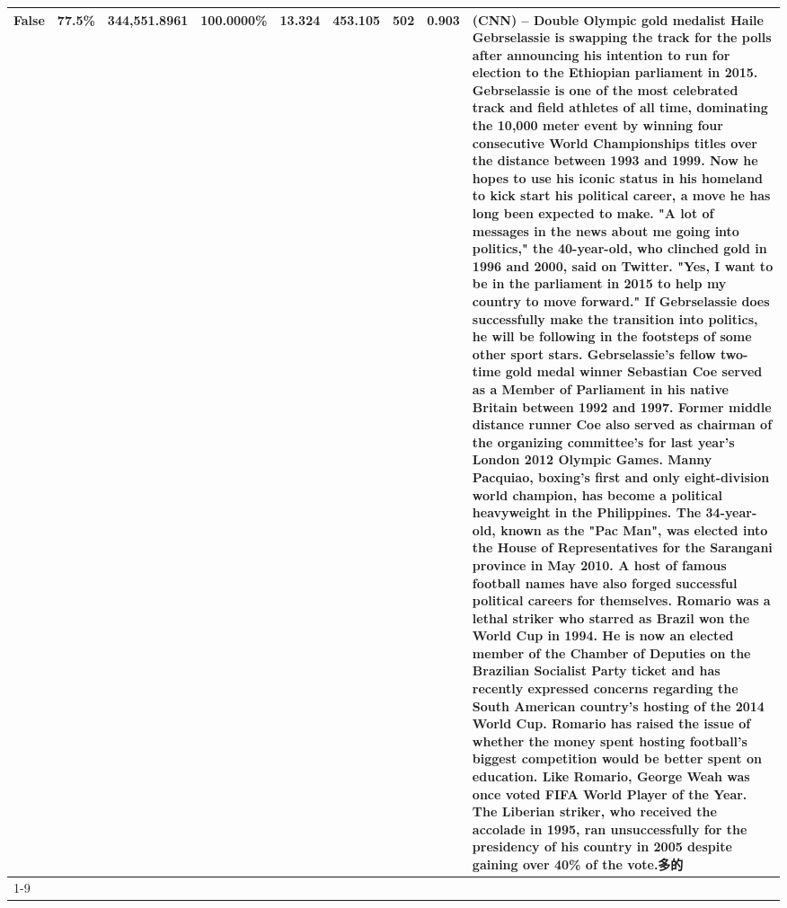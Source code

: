 \begin{table}[H]
{\begin{tabular}{lllrlllll}
False & 77.5\% & 344,551.8961 & \bfseries \color{red} 100.0000\% & 13.324 & 453.105 & 502 & 0.903 & (CNN) -- Double Olympic gold medalist Haile Gebrselassie is swapping the track for the polls after announcing his intention to run for election to the Ethiopian parliament in 2015. Gebrselassie is one of the most celebrated track and field athletes of all time, dominating the 10,000 meter event by winning four consecutive World Championships titles over the distance between 1993 and 1999. Now he hopes to use his iconic status in his homeland to kick start his political career, a move he has long been expected to make. "A lot of messages in the news about me going into politics," the 40-year-old, who clinched gold in 1996 and 2000, said on Twitter. "Yes, I want to be in the parliament in 2015 to help my country to move forward." If Gebrselassie does successfully make the transition into politics, he will be following in the footsteps of some other sport stars. Gebrselassie's fellow two-time gold medal winner Sebastian Coe served as a Member of Parliament in his native Britain between 1992 and 1997. Former middle distance runner Coe also served as chairman of the organizing committee's for last year's London 2012 Olympic Games. Manny Pacquiao, boxing's first and only eight-division world champion, has become a political heavyweight in the Philippines. The 34-year-old, known as the "Pac Man", was elected into the House of Representatives for the Sarangani province in May 2010. A host of famous football names have also forged successful political careers for themselves. Romario was a lethal striker who starred as Brazil won the World Cup in 1994. He is now an elected member of the Chamber of Deputies on the Brazilian Socialist Party ticket and has recently expressed concerns regarding the South American country's hosting of the 2014 World Cup. Romario has raised the issue of whether the money spent hosting football's biggest competition would be better spent on education. Like Romario, George Weah was once voted FIFA World Player of the Year. The Liberian striker, who received the accolade in 1995, ran unsuccessfully for the presidency of his country in 2005 despite gaining over 40\% of the vote.多的 \\
\cline{1-9}

\end{tabular}}
\end{table}
